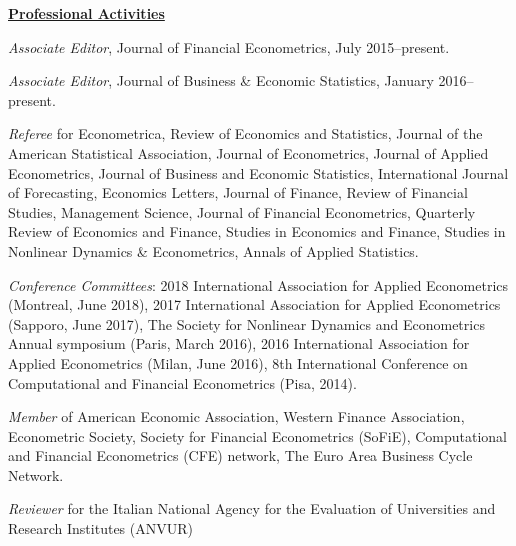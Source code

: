 \documentclass[12pt]{article}
\begin{document}
\underline{\textbf{Professional Activities}}
\begin{description}
	
\item \textit{Associate Editor}, Journal of Financial Econometrics, July 2015--present. 
\item \textit{Associate Editor}, Journal of Business \& Economic Statistics, January 2016--present.

\item \emph{Referee} for Econometrica, Review of Economics and Statistics, Journal of the American Statistical Association, Journal of Econometrics, Journal of Applied Econometrics, Journal of Business and Economic Statistics, International Journal of Forecasting, Economics Letters, Journal of Finance, Review of Financial Studies, Management Science, Journal of Financial Econometrics, Quarterly Review of Economics and Finance, Studies in Economics and Finance, Studies in Nonlinear Dynamics \& Econometrics, Annals of Applied Statistics.

\item \emph{Conference Committees}: 2018 International Association for Applied Econometrics (Montreal, June 2018), 2017 International Association for Applied Econometrics (Sapporo, June 2017), The Society for Nonlinear Dynamics and Econometrics Annual symposium (Paris, March 2016),  2016 International Association for Applied Econometrics (Milan, June 2016), 8th International Conference on Computational and Financial Econometrics (Pisa, 2014).

\item\emph{Member} of American Economic Association, Western Finance Association, Econometric Society, Society for Financial Econometrics (SoFiE), Computational and Financial Econometrics (CFE) network, The Euro Area Business Cycle Network.

\item \emph{Reviewer} for the Italian National Agency for the Evaluation of Universities and Research Institutes (ANVUR) 
\end{description}
 
\end{document}
